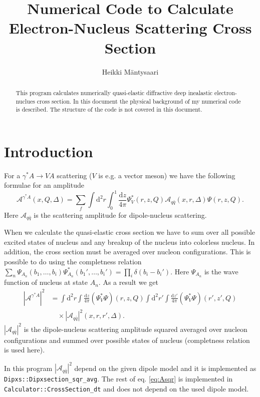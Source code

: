 \documentclass[a4paper,12pt]{article}
\title{Numerical Code to Calculate Electron-Nucleus Scattering Cross Section}
\author{Heikki Mäntysaari}
\date{}
\newcommand{\code}[1]{\texttt{#1}}
\newcommand{\der}{\mathrm{d}}
\newcommand{\A}{\mathcal{A}}
\begin{document}
 
\maketitle
\begin{abstract}
This program calculates numerically quasi-elastic diffractive deep inealastic electron-nuclues cross section. In this document the physical background of my numerical code is described. The structure of the code is not covered in this document.
\end{abstract}

\section{Introduction}
For a $\gamma^*A \rightarrow VA$ scattering ($V$ is e.g. a vector meson) we have the following formulae for an amplitude \cite{Caldwell:2009ke}
\begin{equation}
	\A^{\gamma^* A}(x,Q,\Delta) =	\sum_f \int \der^2 r \int_0^1 \frac{\der z}{4\pi} \Psi_V^*(r,z,Q) \A_{q\bar q}(x,r,\Delta) \Psi(r,z,Q).
\end{equation}
Here $\A_{q\bar q}$ is the scattering amplitude for dipole-nucleus scattering. 

When we calculate the quasi-elastic cross section we have to sum over all possible excited states of nucleus and any breakup of the nucleus into colorless nucleus. In addition, the cross section must be averaged over nucleon configurations. This is possible to do using the completness relation $\sum_n \Psi_{A_n}(b_1,\dots,b_i) \Psi_{A_n}^*(b_1',\dots,b_i') = \prod_i \delta(b_i-b_i')$. Here $\Psi_{A_n}$ is the wave function of nucleus at state $A_n$. As a result we get
\begin{equation}
\begin{split}
	\label{eq:Asqr}
	|\A^{\gamma^* A}|^2 &= \int \der^2 r \int \frac{\der z}{4\pi} (\Psi_V^*\Psi)(r,z,Q) \int \der^2 r' \int \frac{\der z'}{4\pi} (\Psi_V^*\Psi)(r',z',Q) \\
	&\quad  \times |\A_{q\bar q}|^2(x,r,r',\Delta).
\end{split}
\end{equation}
$|\A_{q\bar q}|^2$ is the dipole-nucleus scattering amplitude squared averaged over nucleon configurations and summed over possible states of nucleus (completness relation is used here).

In this program $|\A_{q\bar q}|^2$ depend on the given dipole model and it is implemented as \code{Dipxs::Dipxsection\_sqr\_avg}. The rest of eq. \eqref{eq:Asqr} is implemented in \code{Calculator::CrossSection\_dt} and does not depend on the used dipole model.
\end{document}
